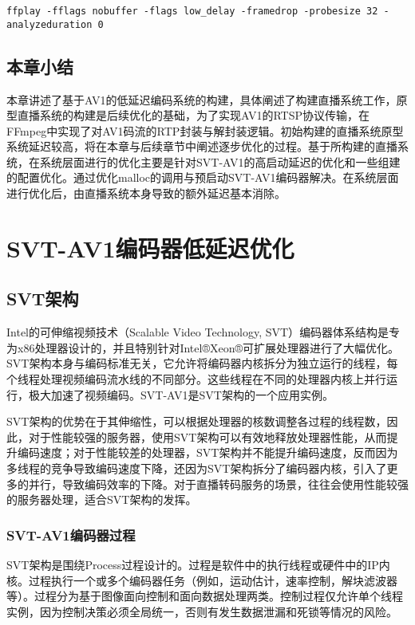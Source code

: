 	\texttt{ffplay -fflags nobuffer -flags low\_delay -framedrop -probesize 32 -analyzeduration 0}
\section{本章小结}
  本章讲述了基于AV1的低延迟编码系统的构建，具体阐述了构建直播系统工作，原型直播系统的构建是后续优化的基础，为了实现AV1的RTSP协议传输，在FFmpeg中实现了对AV1码流的RTP封装与解封装逻辑。初始构建的直播系统原型系统延迟较高，将在本章与后续章节中阐述逐步优化的过程。基于所构建的直播系统，在系统层面进行的优化主要是针对SVT-AV1的高启动延迟的优化和一些组建的配置优化。通过优化malloc的调用与预启动SVT-AV1编码器解决。在系统层面进行优化后，由直播系统本身导致的额外延迟基本消除。


\chapter{SVT-AV1编码器低延迟优化}

\section{SVT架构}
  Intel的可伸缩视频技术（Scalable Video Technology, SVT）\cite{ScalableVideoTechnology2019}编码器体系结构是专为x86处理器设计的，并且特别针对Intel®Xeon®可扩展处理器进行了大幅优化。SVT架构本身与编码标准无关，它允许将编码器内核拆分为独立运行的线程，每个线程处理视频编码流水线的不同部分。这些线程在不同的处理器内核上并行运行，极大加速了视频编码。SVT-AV1是SVT架构的一个应用实例。

  SVT架构的优势在于其伸缩性，可以根据处理器的核数调整各过程的线程数，因此，对于性能较强的服务器，使用SVT架构可以有效地释放处理器性能，从而提升编码速度；对于性能较差的处理器，SVT架构并不能提升编码速度，反而因为多线程的竞争导致编码速度下降，还因为SVT架构拆分了编码器内核，引入了更多的并行，导致编码效率的下降。对于直播转码服务的场景，往往会使用性能较强的服务器处理，适合SVT架构的发挥。

\subsection{SVT-AV1编码器过程\cite{EncoderDesignSVTAV1}}
  SVT架构是围绕Process过程设计的。过程是软件中的执行线程或硬件中的IP内核。过程执行一个或多个编码器任务（例如，运动估计，速率控制，解块滤波器等）。过程分为基于图像面向控制和面向数据处理两类。控制过程仅允许单个线程实例，因为控制决策必须全局统一，否则有发生数据泄漏和死锁等情况的风险。

